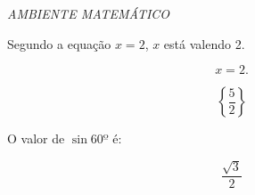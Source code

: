 \documentclass[12pt, a4paper, oneside]{book}
\begin{document}
\hrulefill

\begin{center}
\Large{\textit{AMBIENTE MATEMÁTICO}}
\end{center}

\hrulefill

\vspace{0.5cm}

Segundo a equação $ x = 2 $, $x$ está valendo 2.

\begin{equation}
x = 2.
\end{equation}

\begin{equation}
\left\lbrace \frac{5}{2} \right\rbrace
\end{equation}

O valor de $\sin 60º$ é:

\begin{equation}
\frac{\sqrt{3}}{2}
\end{equation}
\end{document}
